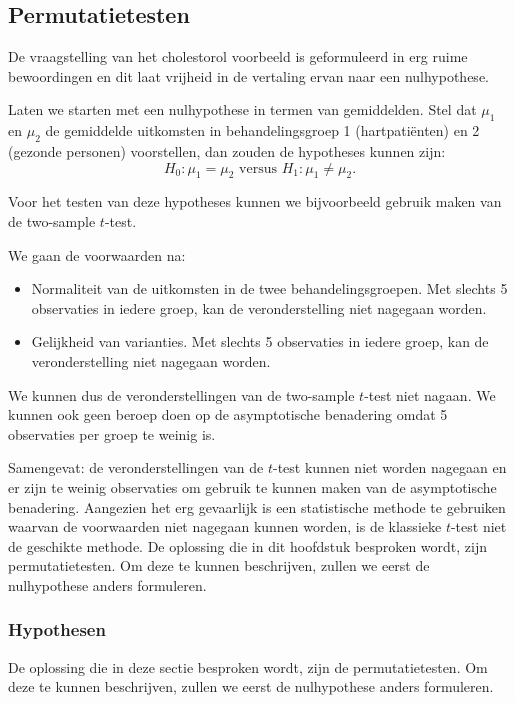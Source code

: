 \documentclass[12pt,dutch,coursenotes]{book}
\providecommand{\tightlist}{%
  \setlength{\itemsep}{0pt}\setlength{\parskip}{0pt}}
\theoremstyle{definition}
\theoremstyle{definition}
\theoremstyle{definition}
\theoremstyle{remark}
\begin{document}
\subsection{Permutatietesten}\label{permutatietesten}

De vraagstelling van het cholestorol voorbeeld is geformuleerd in erg
ruime bewoordingen en dit laat vrijheid in de vertaling ervan naar een
nulhypothese.

Laten we starten met een nulhypothese in termen van gemiddelden. Stel
dat \(\mu_1\) en \(\mu_2\) de gemiddelde uitkomsten in behandelingsgroep
1 (hartpatiënten) en 2 (gezonde personen) voorstellen, dan zouden de
hypotheses kunnen zijn:
\[H_0: \mu_1=\mu_2 \text{ versus } H_1: \mu_1\neq \mu_2.\]

Voor het testen van deze hypotheses kunnen we bijvoorbeeld gebruik maken
van de two-sample \(t\)-test.

We gaan de voorwaarden na:

\begin{itemize}
\tightlist
\item
  Normaliteit van de uitkomsten in de twee behandelingsgroepen. Met
  slechts 5 observaties in iedere groep, kan de veronderstelling niet
  nagegaan worden.
\item
  Gelijkheid van varianties. Met slechts 5 observaties in iedere groep,
  kan de veronderstelling niet nagegaan worden.
\end{itemize}

We kunnen dus de veronderstellingen van de two-sample \(t\)-test niet
nagaan. We kunnen ook geen beroep doen op de asymptotische benadering
omdat 5 observaties per groep te weinig is.

Samengevat: de veronderstellingen van de \(t\)-test kunnen niet worden
nagegaan en er zijn te weinig observaties om gebruik te kunnen maken van
de asymptotische benadering. Aangezien het erg gevaarlijk is een
statistische methode te gebruiken waarvan de voorwaarden niet nagegaan
kunnen worden, is de klassieke \(t\)-test niet de geschikte methode. De
oplossing die in dit hoofdstuk besproken wordt, zijn permutatietesten.
Om deze te kunnen beschrijven, zullen we eerst de nulhypothese anders
formuleren.

\subsubsection{Hypothesen}\label{hypothesen}

De oplossing die in deze sectie besproken wordt, zijn de
permutatietesten. Om deze te kunnen beschrijven, zullen we eerst de
nulhypothese anders formuleren.
\end{document}
